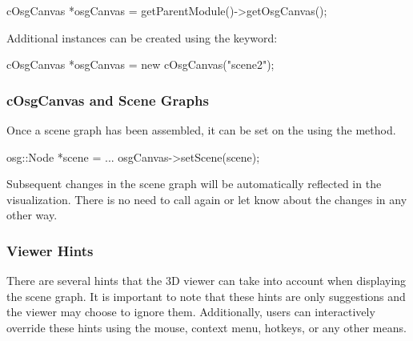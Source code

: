 \begin{cpp}
cOsgCanvas *osgCanvas = getParentModule()->getOsgCanvas();
\end{cpp}

Additional  instances can be created using the  keyword:

\begin{cpp}
cOsgCanvas *osgCanvas = new cOsgCanvas("scene2");
\end{cpp}

\subsubsection{cOsgCanvas and Scene Graphs}
\label{sec:graphics:osgcanvas-and-scene-graphs}

Once a scene graph has been assembled, it can be set on the 
using the  method.

\begin{cpp}
osg::Node *scene = ...
osgCanvas->setScene(scene);
\end{cpp}

Subsequent changes in the scene graph will be automatically reflected in the
visualization. There is no need to call  again or let {\opp}
know about the changes in any other way.

\subsubsection{Viewer Hints}
\label{sec:graphics:osgcanvas-viewer-hints}

There are several hints that the 3D viewer can take into account when displaying
the scene graph. It is important to note that these hints are only suggestions
and the viewer may choose to ignore them. Additionally, users can interactively
override these hints using the mouse, context menu, hotkeys, or any other means.

